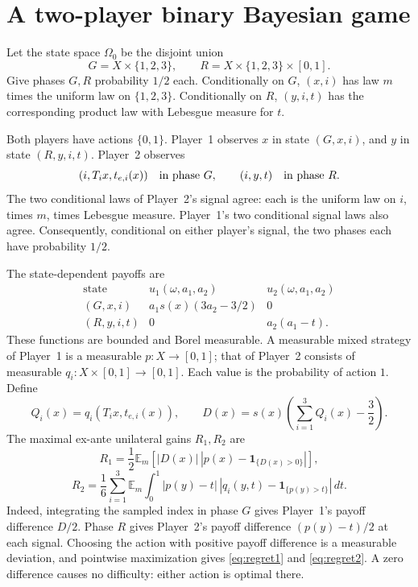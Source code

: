 \documentclass[11pt]{article}
\theoremstyle{remark}
\newcommand{\E}{\mathbb E}
\newcommand{\ind}{\mathbf 1}
\begin{document}
\section{A two-player binary Bayesian game}

Let the state space $\Omega_0$ be the disjoint union
\[
 G=X\times\{1,2,3\},\qquad
 R=X\times\{1,2,3\}\times[0,1].
\]
Give phases $G,R$ probability $1/2$ each. Conditionally on $G$,
$(x,i)$ has law $m$ times the uniform law on $\{1,2,3\}$.
Conditionally on $R$, $(y,i,t)$ has the corresponding product law
with Lebesgue measure for $t$.

Both players have actions $\{0,1\}$. Player~1 observes $x$ in
state $(G,x,i)$, and $y$ in state $(R,y,i,t)$. Player~2 observes
\begin{equation}\label{eq:signals}
 (i,T_i x,t_{e,i}(x))\quad\hbox{in phase }G,
 \qquad (i,y,t)\quad\hbox{in phase }R.
\end{equation}
The two conditional laws of Player~2's signal agree: each is the
uniform law on $i$, times $m$, times Lebesgue measure. Player~1's two
conditional signal laws also agree. Consequently, conditional on either
player's signal, the two phases each have probability $1/2$.

The state-dependent payoffs are
\begin{equation}\label{eq:basepayoffs}
\begin{array}{c|cc}
 \text{state}&u_1(\omega,a_1,a_2)&u_2(\omega,a_1,a_2)\\ \hline
 (G,x,i)&a_1s(x)(3a_2-3/2)&0\\
 (R,y,i,t)&0&a_2(a_1-t).
\end{array}
\end{equation}
These functions are bounded and Borel measurable. A measurable mixed
strategy of Player~1 is a measurable $p:X\to[0,1]$; that of
Player~2 consists of measurable
$q_i:X\times[0,1]\to[0,1]$. Each value is the probability of
action $1$. Define
\[
 Q_i(x)=q_i(T_i x,t_{e,i}(x)),\qquad
 D(x)=s(x)\left(\sum_{i=1}^3Q_i(x)-\frac32\right).
\]
The maximal ex-ante unilateral gains $R_1,R_2$ are
\begin{equation}\label{eq:regret1}
 R_1=\frac12\E_m
   \left[|D(x)|\,|p(x)-\ind_{\{D(x)>0\}}|\right],
\end{equation}
\begin{equation}\label{eq:regret2}
 R_2=\frac16\sum_{i=1}^3\E_m\int_0^1
   |p(y)-t|\,|q_i(y,t)-\ind_{\{p(y)>t\}}|\,dt.
\end{equation}
Indeed, integrating the sampled index in phase $G$ gives Player~1's
payoff difference $D/2$. Phase $R$ gives Player~2's payoff difference
$(p(y)-t)/2$ at each signal. Choosing the action with positive payoff
difference is a measurable deviation, and pointwise maximization gives
\eqref{eq:regret1} and \eqref{eq:regret2}. A zero difference causes no
difficulty: either action is optimal there.
\end{document}
